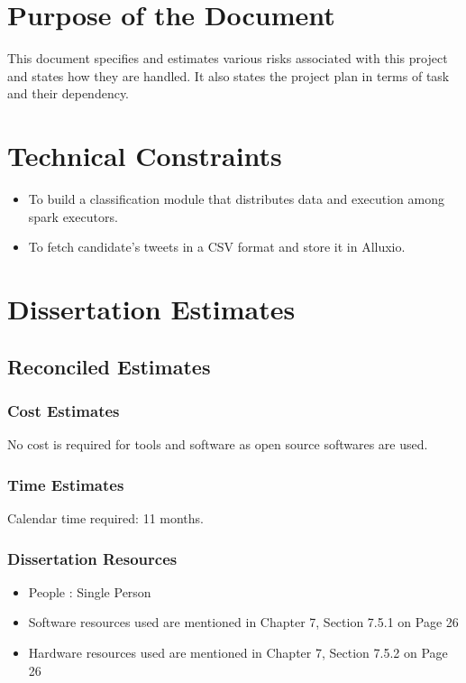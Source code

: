 \documentclass[oneside,a4paper,12pt]{pictreport}
\begin{document}
\section{Purpose of the Document}
This document specifies and estimates various risks associated with this project and states how they are handled. It also states the project plan in terms of task and their dependency.

\section{Technical Constraints}
\begin{itemize}
\item To build a classification module that distributes data and execution among spark executors.
\item To fetch candidate's tweets in a CSV format and store it in Alluxio.
\end{itemize}

\section{Dissertation Estimates}
\subsection{Reconciled Estimates}
\subsubsection{Cost Estimates}
No cost is required for tools and software as open source softwares are used.
\subsubsection{Time Estimates}
Calendar time required: 11 months.
\subsubsection{Dissertation Resources}
\begin{itemize}
\item People : Single Person
\item Software resources used are mentioned in Chapter 7, Section 7.5.1 on Page 26
\item Hardware resources used are mentioned in Chapter 7, Section 7.5.2 on Page 26

\end{itemize}
\end{document}
